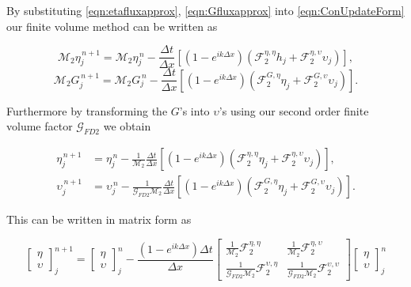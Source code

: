By substituting \eqref{eqn:etafluxapprox}, \eqref{eqn:Gfluxapprox} into \eqref{eqn:ConUpdateForm} our finite volume method can be written as

\begin{equation*}
\mathcal{M}_2 \eta^{\,n + 1}_{j} = \mathcal{M}_2 \eta^{\,n }_{j} - \frac{\Delta t}{\Delta x}  \left[ \left(1 - e^{ik\Delta x}\right) \left(\mathcal{F}_2^{\eta,\eta} h_{j}  + \mathcal{F}_2^{\eta,\upsilon} \upsilon_j \right) \right],
\end{equation*}
\begin{equation*}
\mathcal{M}_2 G^{\,n + 1}_{j} = \mathcal{M}_2 G^{\,n }_{j} - \frac{\Delta t}{\Delta x}  \left[ \left(1 - e^{ik\Delta x}\right) \left(  \mathcal{F}_2^{G,\eta} \eta_{j}  + \mathcal{F}_2^{G,\upsilon} \upsilon_j \right) \right].
\end{equation*}
	
Furthermore by transforming the $G$'s into $\upsilon$'s using our second order finite volume factor $\mathcal{G}_{FD2}$ we obtain
	
\begin{align*}
\eta^{\,n + 1}_{j} &= \eta^{\,n }_{j} - \frac{1}{\mathcal{M}_2}\frac{\Delta t}{\Delta x}  \left[ \left(1 - e^{ik\Delta x}\right) \left(\mathcal{F}_2^{\eta,\eta} \eta_{j}  + \mathcal{F}_2^{\eta,\upsilon} \upsilon_j \right) \right], \\
\upsilon^{\,n + 1}_{j} &= \upsilon^{\,n }_{j} -  \frac{1}{\mathcal{G}_{FD2} \mathcal{M}_2}\frac{\Delta t}{\Delta x}  \left[ \left(1 - e^{ik\Delta x}\right) \left(  \mathcal{F}_2^{G,\eta} \eta_{j}  + \mathcal{F}_2^{G,\upsilon} \upsilon_j \right) \right].
\end{align*}

This can be written in matrix form as

\begin{equation*}
\begin{bmatrix}
\eta \\ \upsilon
\end{bmatrix}^{n+1}_j = \begin{bmatrix}
\eta \\ \upsilon
\end{bmatrix}^{n}_j - \frac{\left(1 - e^{ik\Delta x}\right) \Delta t}{\Delta x}\begin{bmatrix}
\frac{1}{\mathcal{M}_2} \mathcal{F}_2^{\eta,\eta} & \frac{1}{\mathcal{M}_2}\mathcal{F}_2^{\eta,\upsilon} \\ \frac{1}{\mathcal{G}_{FD2} \mathcal{M}_2}\mathcal{F}_2^{\upsilon,\eta} & \frac{1}{\mathcal{G}_{FD2} \mathcal{M}_2}\mathcal{F}_2^{\upsilon,\upsilon} 
\end{bmatrix}\begin{bmatrix}
\eta \\ \upsilon
\end{bmatrix}^{n}_j
\end{equation*}


